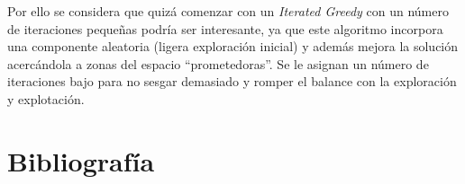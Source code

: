 \documentclass[12pt,letterpaper]{article}
\begin{document}
Por ello se considera que quizá comenzar con un \textit{Iterated Greedy} con un número de iteraciones pequeñas podría ser interesante, ya que este algoritmo incorpora una componente aleatoria (ligera exploración inicial) y además mejora la solución acercándola a zonas del espacio ``prometedoras''. Se le asignan un número de iteraciones bajo para no sesgar demasiado y romper el balance con la exploración y explotación.

\newpage
\section{Bibliografía}

\printbibliography[heading=none, category=cited]
\end{document}
